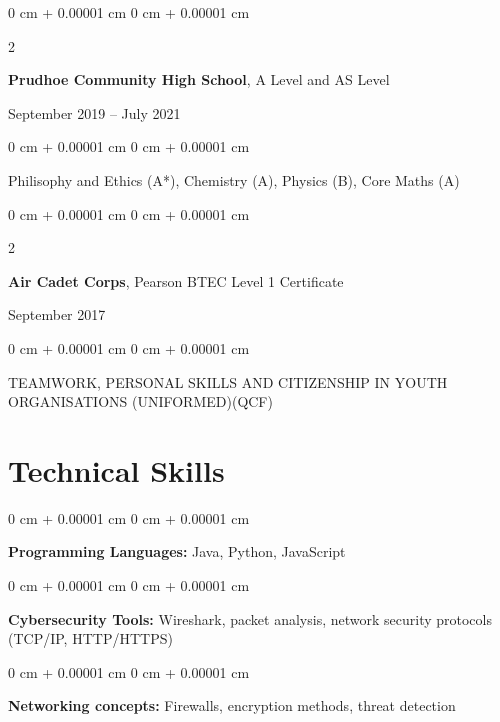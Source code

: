 \documentclass[10pt, letterpaper]{article}
\newenvironment{highlights}{
    \begin{itemize}[
        topsep=0.10 cm,
        parsep=0.10 cm,
        partopsep=0pt,
        itemsep=0pt,
        leftmargin=0 cm + 10pt
    ]
}{
    \end{itemize}
} %
\newenvironment{onecolentry}{
    \begin{adjustwidth}{
        0 cm + 0.00001 cm
    }{
        0 cm + 0.00001 cm
    }
}{
    \end{adjustwidth}
} %
\newenvironment{twocolentry}[2][]{
    \onecolentry
    \def\secondColumn{#2}
    \setcolumnwidth{\fill, 4.5 cm}
    \begin{paracol}{2}
}{
    \switchcolumn \raggedleft \secondColumn
    \end{paracol}
    \endonecolentry
} %
\begin{document}
\vspace{0.2 cm}
    \begin{twocolentry}{
    September 2019 – July 2021
}
    \textbf{Prudhoe Community High School}, A Level and AS Level  
\end{twocolentry}
\vspace{-0.15 cm} %
\begin{onecolentry}
    \begin{highlights}
        {Philisophy and Ethics (A*), Chemistry (A), Physics (B), Core Maths (A)}
    \end{highlights}
\end{onecolentry}

\vspace{0.2 cm}
    \begin{twocolentry}{
    September 2017 
}
    \textbf{Air Cadet Corps},  Pearson BTEC Level 1 Certificate 
\end{twocolentry}
\vspace{-0.15 cm} %
\begin{onecolentry}
    \begin{highlights}
        {TEAMWORK, PERSONAL SKILLS AND CITIZENSHIP IN YOUTH ORGANISATIONS (UNIFORMED)(QCF)}
     \end{highlights}
\end{onecolentry}



\section{Technical Skills}


       
        \begin{onecolentry}
            \textbf{Programming Languages:} Java, Python, JavaScript
        \end{onecolentry}

        \vspace{0.05 cm}

        \begin{onecolentry}
            \textbf{Cybersecurity Tools:} Wireshark, packet analysis, network security protocols (TCP/IP, HTTP/HTTPS)
        \end{onecolentry}
        
        \vspace{0.05 cm}

       

        \begin{onecolentry}
            \textbf{Networking concepts:} Firewalls, encryption methods, threat detection
        \end{onecolentry}
         \vspace{0.05 cm}
\end{document}
